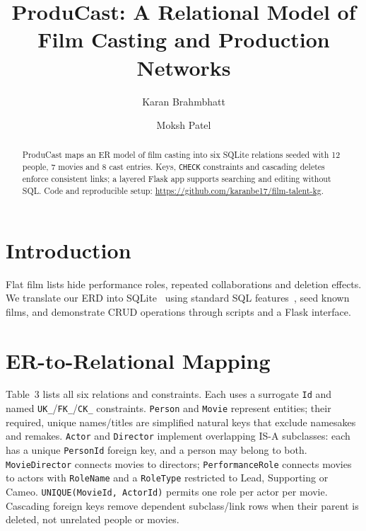\documentclass[sigconf,nonacm]{acmart}
\newcommand{\tn}[1]{\texttt{#1}}
\begin{document}
\title{ProduCast: A Relational Model of Film Casting and Production Networks}
\author{Karan Brahmbhatt}
\author{Moksh Patel}

\begin{abstract}
ProduCast maps an ER model of film casting into six SQLite relations seeded with 12 people, 7 movies and 8 cast entries. Keys, \tn{CHECK} constraints and cascading deletes enforce consistent links; a layered Flask app supports searching and editing without SQL. Code and reproducible setup: \url{https://github.com/karanbe17/film-talent-kg}.
\end{abstract}


\maketitle

\section{Introduction}
Flat film lists hide performance roles, repeated collaborations and deletion effects. We translate our ERD into SQLite~\cite{sqlite} using standard SQL features~\cite{iso}, seed known films, and demonstrate CRUD operations through scripts and a Flask interface.

\section{ER-to-Relational Mapping}
Table~3 lists all six relations and constraints. Each uses a surrogate \tn{Id} and named \tn{UK\_}/\tn{FK\_}/\tn{CK\_} constraints. \tn{Person} and \tn{Movie} represent entities; their required, unique names/titles are simplified natural keys that exclude namesakes and remakes. \tn{Actor} and \tn{Director} implement overlapping IS-A subclasses: each has a unique \tn{PersonId} foreign key, and a person may belong to both. \tn{MovieDirector} connects movies to directors; \tn{PerformanceRole} connects movies to actors with \tn{RoleName} and a \tn{RoleType} restricted to Lead, Supporting or Cameo. \tn{UNIQUE(MovieId, ActorId)} permits one role per actor per movie. Cascading foreign keys remove dependent subclass/link rows when their parent is deleted, not unrelated people or movies.
\end{document}
